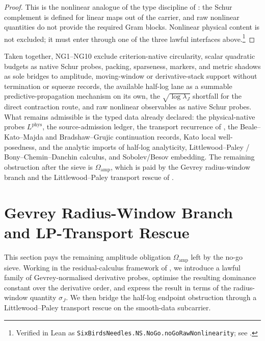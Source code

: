 \documentclass[11pt]{article}
\newcommand{\Lphys}{L^{\mathrm{phys}}}
\newcommand{\Omamp}{\Omega_{\mathrm{amp}}}
\newcommand{\sigmaJ}{\sigma_J}
\newcommand{\lambdaJ}{\lambda_J}
\theoremstyle{definition}
\begin{document}
\begin{proof}
This is the nonlinear analogue of the type discipline of
: the Schur complement is defined
for linear maps out of the carrier, and raw nonlinear quantities do
not provide the required Gram blocks.  Nonlinear physical content is
not excluded; it must enter through one of the three lawful interfaces
above.\footnote{Verified in Lean as \texttt{SixBirdsNeedles.NS.NoGo.noGoRawNonlinearity}; see .}
\end{proof}

Taken together, NG1--NG10 exclude criterion-native circularity,
scalar quadratic budgets as native Schur probes, packing, sparseness,
markers, and metric shadows as sole bridges to amplitude,
moving-window or derivative-stack support without termination or
squeeze records, the available half-log lane as a summable
predictive-propagation mechanism on its own, the
\(\sqrt{\log\lambdaJ}\) shortfall for the direct contraction route,
and raw nonlinear observables as native Schur probes.  What remains
admissible is the typed data already declared: the physical-native
probes \(\Lphys\), the source-admission ledger, the transport
recurrence of , the
Beale--Kato--Majda and Bradshaw--Grujic continuation records, Kato
local well-posedness, and the analytic imports of half-log
analyticity, Littlewood--Paley / Bony--Chemin--Danchin calculus, and
Sobolev/Besov embedding.  The remaining obstruction after the sieve is
\(\Omamp\), which is paid by the Gevrey radius-window branch and the
Littlewood--Paley transport rescue of .

 

\section{Gevrey Radius-Window Branch and LP-Transport Rescue}
\label{sec:gevrey-lp}

This section pays the remaining amplitude obligation \(\Omamp\) left by
the no-go sieve.  Working in the residual-calculus framework of
\citet{Tsiokos2026XiCompanion}, we introduce a lawful family of
Gevrey-normalised derivative probes, optimise the resulting dominance
constant over the derivative order, and express the result in terms of
the radius-window quantity \(\sigmaJ\).  We then bridge the half-log
endpoint obstruction through a Littlewood--Paley transport rescue on
the smooth-data subcarrier.
\end{document}
